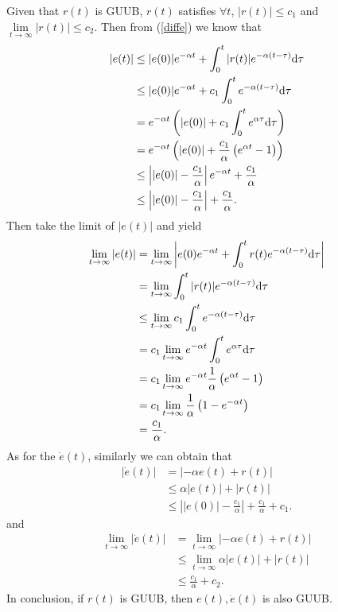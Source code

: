 \documentclass[12pt,a4paper]{article}
\begin{document}
\indent Given that $r(t)$ is GUUB, $r(t)$ satisfies $\forall t$, $|r(t)|\le c_1$ and $\lim\limits_{t\to\infty}|r(t)|\le c_2$. Then from (\ref{diffe}) we know that
\begin{equation}
\begin{aligned}
|e(t)| &\le |e(0)|e^{-\alpha t}+\int_0^t|r(t)|e^{-\alpha(t-\tau)}{\rm d}\tau \\
       &\le |e(0)|e^{-\alpha t}+c_1 \int_0^te^{-\alpha(t-\tau)}{\rm d}\tau \\
       & =  e^{-\alpha t}\left(|e(0)|+c_1 \int_0^te^{\alpha\tau}{\rm d}\tau\right) \\
       & =  e^{-\alpha t}\left(|e(0)|+\frac{c_1}{\alpha}\left(e^{\alpha t}-1\right)\right) \\
       &\le \left||e(0)|-\frac{c_1}{\alpha}\right|e^{-\alpha t}+\frac{c_1}{\alpha} \\
       &\le \left||e(0)|-\frac{c_1}{\alpha}\right|+\frac{c_1}{\alpha}
       .
\end{aligned}
\end{equation}
Then take the limit of $|e(t)|$ and yield
\begin{equation}
\begin{aligned}
\lim\limits_{t\to\infty}|e(t)|
       & =  \lim\limits_{t\to\infty} \left|e(0)e^{-\alpha t}+\int_0^tr(t)e^{-\alpha(t-\tau)}{\rm d}\tau\right| \\
       & =  \lim\limits_{t\to\infty} \int_0^t|r(t)|e^{-\alpha(t-\tau)}{\rm d}\tau \\
       &\le \lim\limits_{t\to\infty} c_1 \int_0^te^{-\alpha(t-\tau)}{\rm d}\tau \\
       & =  c_1 \lim\limits_{t\to\infty} e^{-\alpha t} \int_0^te^{\alpha\tau}{\rm d}\tau \\
       & =  c_1 \lim\limits_{t\to\infty} e^{-\alpha t} \frac{1}{\alpha} \left(e^{\alpha t}-1\right) \\
       & =  c_1 \lim\limits_{t\to\infty} \frac{1}{\alpha} \left(1-e^{-\alpha t}\right) \\
       & =  \frac{c_1}{\alpha}
       .
\end{aligned}
\end{equation}
As for the $\dot{e}(t)$, similarly we can obtain that
\begin{equation}
\begin{aligned}
|\dot{e}(t)|
       & =  \left|-\alpha e(t)+r(t)\right| \\
       &\le \alpha|e(t)| + |r(t)| \\
       &\le \left||e(0)|-\frac{c_1}{\alpha}\right|+\frac{c_1}{\alpha} + c_1
       .
\end{aligned}
\end{equation}
and
\begin{equation}
\begin{aligned}
\lim\limits_{t\to\infty}|\dot{e}(t)|
       & =  \lim\limits_{t\to\infty} \left|-\alpha e(t)+r(t)\right| \\
       &\le \lim\limits_{t\to\infty} \alpha|e(t)| + |r(t)| \\
       &\le \frac{c_1}{\alpha}+c_2
       .
\end{aligned}
\end{equation}
In conclusion, if $r(t)$ is GUUB, then $e(t), \dot{e}(t)$ is also GUUB.
\end{document}
